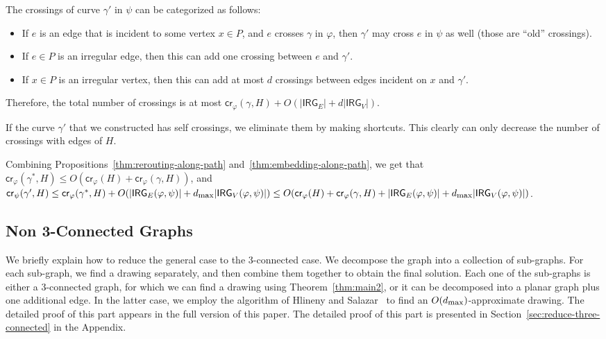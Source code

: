 \documentclass[twoside,leqno,twocolumn]{article}
\renewcommand{\phi}{\varphi}
\newcommand{\cro}{\mathsf{cr}}
\newcommand{\irreg}{\mathsf{IRG}}
\newcommand{\dmax}{d_{\mbox{\textup{\footnotesize{max}}}}}
\begin{document}
The crossings of curve $\gamma'$ in $\psi$ can be categorized as follows:
\begin{itemize}
\item If $e$ is an edge that is incident to some vertex $x\in P$, and $e$ crosses $\gamma$ in $\phi$, 
then $\gamma'$ may cross $e$ in $\psi$ as well (those are ``old'' crossings).
\item If $e\in P$ is an irregular edge, then this can add one crossing between $e$ and $\gamma'$. 
\item If $x\in P$ is an irregular vertex, then this can add at most $d$ crossings between edges incident on $x$ and $\gamma'$.
\end{itemize}
Therefore, the total number of crossings is at most $\cro_{\phi}(\gamma, H) + O(|\irreg_E| + d|\irreg_V|)$. 

If the curve $\gamma'$ that we constructed has self crossings, we eliminate them by making shortcuts.
This clearly can only decrease the number of crossings with edges of $H$.
\fi


Combining Propositions~\ref{thm:rerouting-along-path} and~\ref{thm:embedding-along-path}, we get that $\cro_{\phi}(\gamma^*, H)\leq O(\cro_{\phi}(H) + \cro_{\phi}(\gamma, H))$, and $\cro_{\psi}(\gamma',H)\leq \cro_{\phi}(\gamma^*, H) + O(|\irreg_E(\phi,\psi)| + \dmax|\irreg_V(\phi,\psi)|)\leq O(\cro_{\phi}(H) + \cro_{\phi}(\gamma, H) + |\irreg_E(\phi,\psi)| + \dmax|\irreg_V(\phi,\psi)|)$.


\subsection{Non 3-Connected Graphs}
\vspace{-3mm}

We briefly explain how to reduce the general case to the $3$-connected case. We decompose the graph into a collection of sub-graphs. For each sub-graph, we find a drawing separately, and then combine them together to obtain the final solution. Each one of the sub-graphs is either a $3$-connected graph, for which we can find a drawing using Theorem~\ref{thm:main2}, or it can be decomposed into a planar graph plus one additional edge. In the latter case, we employ the algorithm of Hlineny and Salazar~\cite{HlinenyS06} to find an $O(\dmax)$-approximate drawing. 
\ifabstract
The detailed proof of this part appears in the full version of this paper.
\fi\iffull
The detailed proof of this part is presented in Section~\ref{sec:reduce-three-connected} in the Appendix.
\fi
\end{document}
